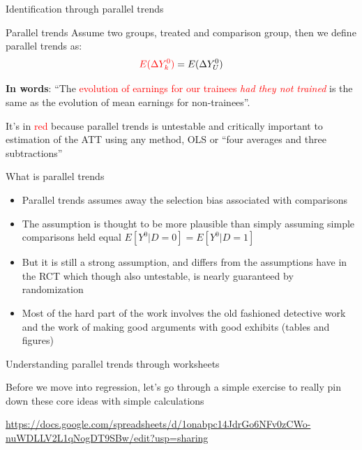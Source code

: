 \documentclass{beamer}
\begin{document}
\begin{frame}{Identification through parallel trends}
	

	\begin{block}{Parallel trends}
	Assume two groups, treated and comparison group, then we define parallel trends as:	 $$\textcolor{red}{E(}\textcolor{red}{\Delta Y^0_k)} = E(\Delta Y^0_U)$$
	\end{block}

\textbf{In words}: ``The \textcolor{red}{evolution of earnings for our trainees \emph{had they not trained}} is the same as the evolution of mean earnings for non-trainees''.  

\bigskip

It's in \textcolor{red}{red} because parallel trends is untestable and critically important to estimation of the ATT using any method, OLS or ``four averages and three subtractions''

	

	
\end{frame}


\begin{frame}{What is parallel trends}

\begin{itemize}
\item Parallel trends assumes away the selection bias associated with comparisons
\item The assumption is thought to be more plausible than simply assuming simple comparisons held equal $E[Y^0|D=0]=E[Y^0|D=1]$
\item But it is still a strong assumption, and differs from the assumptions have in the RCT which though also untestable, is nearly guaranteed by randomization
\item Most of the hard part of the work involves the old fashioned detective work and the work of making good arguments with good exhibits (tables and figures)
\end{itemize}

\end{frame}



\begin{frame}{Understanding parallel trends through worksheets}

Before we move into regression, let's go through a simple exercise to really pin down these core ideas with simple calculations

\bigskip 

\url{https://docs.google.com/spreadsheets/d/1onabpc14JdrGo6NFv0zCWo-nuWDLLV2L1qNogDT9SBw/edit?usp=sharing}

\end{frame}
\end{document}
